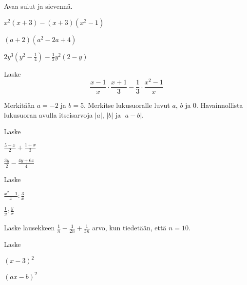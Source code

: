 \begin{tehtava}
Avaa sulut ja sievennä.
\begin{kohdat}
\item \(x^2(x + 3)-(x+3)(x^2 - 1)\)
\item \((a + 2)(a^2 - 2a + 4)\)
\item \(\displaystyle 2y^3\left(y^2-\frac{1}{4}\right) - \frac{1}{2}y^2(2-y)\)
\end{kohdat}
\end{tehtava}

\begin{tehtava}
Laske\[\frac{x-1}{x} \cdot \frac{x+1}{3} - \frac{1}{3} \cdot \frac{x^2-1}{x}\]
\end{tehtava}

\begin{tehtava}
Merkitään $a = -2$ ja $b = 5$. Merkitse lukusuoralle luvut $a$, $b$ ja $0$. Havainnollista lukusuoran avulla itseisarvoja $\left| a \right|$, $\left| b \right|$ ja $\left| a-b \right|$.
\end{tehtava}

\begin{tehtava}
Laske
\begin{kohdat}
\item \(\displaystyle \frac{5-x}{2} + \frac{1+x}{3}\)
\item \(\displaystyle \frac{3y}{2} - \frac{4y+6x}{4}\)
\end{kohdat}
\end{tehtava}

\begin{tehtava}
Laske
\begin{kohdat}
\item \(\displaystyle \frac{x^2-1}{x} : \frac{3}{x}\)
\item \(\displaystyle \frac{1}{y} : \frac{y}{x}\)
\end{kohdat}
\end{tehtava}

\begin{tehtava}
Laske lausekkeen \(\displaystyle \frac{1}{n}-\frac{1}{2n}+\frac{1}{3n}\) arvo, kun tiedetään, että \(n=10\).
\end{tehtava}

\begin{tehtava}
Laske
\begin{kohdat}
\item \((x-3)^2\)
\item \((ax -b)^2\)
\end{kohdat}
\end{tehtava}

